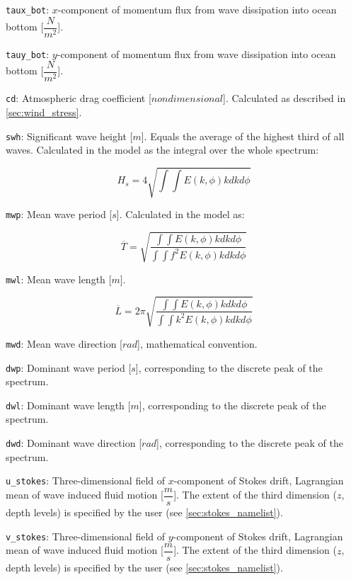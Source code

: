 \documentclass[letterpaper]{article}
\numberwithin{equation}{section}
\begin{document}
\verb+taux_bot+:
$x$-component of momentum flux from wave dissipation 
into ocean bottom [$\dfrac{N}{m^{2}}$].

\verb+tauy_bot+:
$y$-component of momentum flux from wave dissipation 
into ocean bottom [$\dfrac{N}{m^{2}}$].

\verb+cd+:
Atmospheric drag coefficient [$nondimensional$].
Calculated as described in \ref{sec:wind_stress}.

\verb+swh+:
Significant wave height [$m$].
Equals the average of the highest third of all waves.
Calculated in the model as the integral over the whole spectrum:

\begin{equation}
H_{s} = 4 \sqrt{\int\!\int E(k,\phi)kdkd\phi}
\end{equation}

\verb+mwp+:
Mean wave period [$s$]. Calculated in the model as:

\begin{equation}
\overline{T} = \sqrt{\dfrac{\int\!\int E(k,\phi)kdkd\phi}{\int\!\int f^{2}E(k,\phi)kdkd\phi}}
\end{equation}

\verb+mwl+:
Mean wave length [$m$]. 

\begin{equation}
\overline{L} = 2\pi\sqrt{\dfrac{\int\!\int E(k,\phi)kdkd\phi}{\int\!\int k^{2}E(k,\phi)kdkd\phi}}
\end{equation}

\verb+mwd+:
Mean wave direction [$rad$], mathematical convention.

\verb+dwp+:
Dominant wave period [$s$], 
corresponding to the discrete peak of the spectrum. 

\verb+dwl+:
Dominant wave length [$m$],
corresponding to the discrete peak of the spectrum.

\verb+dwd+:
Dominant wave direction [$rad$],
corresponding to the discrete peak of the spectrum.

\verb+u_stokes+:
Three-dimensional field of $x$-component of Stokes drift, 
Lagrangian mean of wave induced fluid motion [$\dfrac{m}{s}$].
The extent of the third dimension ($z$, depth levels) is specified 
by the user (see \ref{sec:stokes_namelist}).

\verb+v_stokes+:
Three-dimensional field of $y$-component of Stokes drift, 
Lagrangian mean of wave induced fluid motion [$\dfrac{m}{s}$].
The extent of the third dimension ($z$, depth levels) is specified 
by the user (see \ref{sec:stokes_namelist}).
\end{document}
